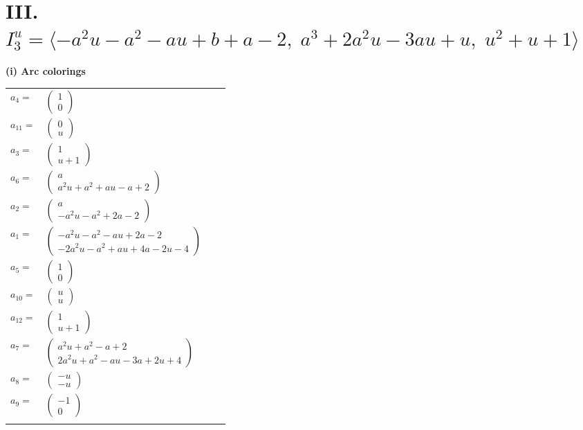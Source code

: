 \documentclass[1p]{elsarticle_modified}
\theoremstyle{definition}
\begin{document}
\centering \section*{III. $I^u_{3}= \langle - a^2 u- a^2- a u+b+a-2,\;a^3+2 a^2 u-3 a u+u,\;u^2+u+1 \rangle$}
\flushleft \textbf{(i) Arc colorings}\\
\begin{tabular}{m{7pt} m{180pt} m{7pt} m{180pt} }
\flushright $a_{4}=$&$\begin{pmatrix}1\\0\end{pmatrix}$ \\
\flushright $a_{11}=$&$\begin{pmatrix}0\\u\end{pmatrix}$ \\
\flushright $a_{3}=$&$\begin{pmatrix}1\\u+1\end{pmatrix}$ \\
\flushright $a_{6}=$&$\begin{pmatrix}a\\a^2 u+a^2+a u- a+2\end{pmatrix}$ \\
\flushright $a_{2}=$&$\begin{pmatrix}a\\- a^2 u- a^2+2 a-2\end{pmatrix}$ \\
\flushright $a_{1}=$&$\begin{pmatrix}- a^2 u- a^2- a u+2 a-2\\-2 a^2 u- a^2+a u+4 a-2 u-4\end{pmatrix}$ \\
\flushright $a_{5}=$&$\begin{pmatrix}1\\0\end{pmatrix}$ \\
\flushright $a_{10}=$&$\begin{pmatrix}u\\u\end{pmatrix}$ \\
\flushright $a_{12}=$&$\begin{pmatrix}1\\u+1\end{pmatrix}$ \\
\flushright $a_{7}=$&$\begin{pmatrix}a^2 u+a^2- a+2\\2 a^2 u+a^2- a u-3 a+2 u+4\end{pmatrix}$ \\
\flushright $a_{8}=$&$\begin{pmatrix}- u\\- u\end{pmatrix}$ \\
\flushright $a_{9}=$&$\begin{pmatrix}-1\\0\end{pmatrix}$\\&\end{tabular}
\end{document}
